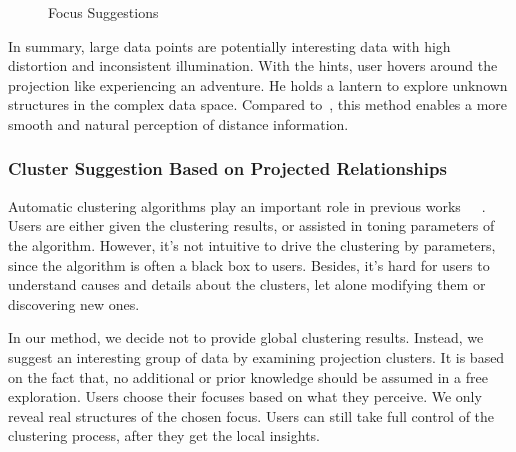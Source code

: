 \begin{figure}[htbp]
\centering
{}
  \caption{Focus Suggestions}
\label{fig:suggestions}
  \end{figure}

In summary, large data points are potentially interesting data with high distortion and inconsistent illumination. With the hints, user hovers around the projection like experiencing an adventure. He holds a lantern to explore unknown structures in the complex data space. Compared to~\cite{DBLP:journals/tvcg/StahnkeDMT16}, this method enables a more smooth and natural perception of distance information.

\subsubsection{Cluster Suggestion Based on Projected Relationships}
Automatic clustering algorithms play an important role in previous works~\cite{DBLP:conf/ieeevast/NamHMZI07}~\cite{DBLP:journals/cgf/LeeKCSP12}~\cite{DBLP:journals/cgf/LiuWTBP15}. Users are either given the clustering results, or assisted in toning parameters of the algorithm. However, it's not intuitive to drive the clustering by parameters, since the algorithm is often a black box to users. Besides, it's hard for users to understand causes and details about the clusters, let alone modifying them or discovering new ones.

In our method, we decide not to provide global clustering results. Instead, we suggest an interesting group of data by examining projection clusters. It is based on the fact that, no additional or prior knowledge should be assumed in a free exploration. Users choose their focuses based on what they perceive. We only reveal real structures of the chosen focus. Users can still take full control of the clustering process, after they get the local insights.

